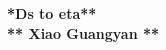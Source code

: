 \begin{titlepage}
    \begin{center}
    {\fontsize{40}{48}\selectfont \bfseries **Ds to eta**} 
    \\\vspace{20pt}
    \vspace{20pt}
    \textbf{** Xiao Guangyan **}
    \vspace{8pt}
    \end{center}
\end{titlepage}